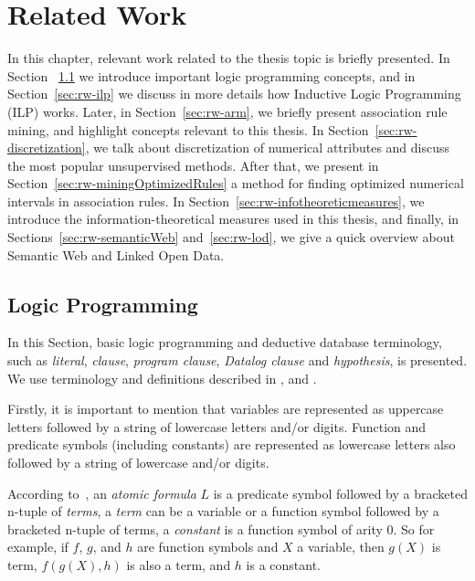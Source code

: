 \chapter{Related Work}
\label{sec:rw-intro}

In this chapter, relevant work related to the thesis topic is briefly presented. In Section 
~\ref{sec:rw-lp} we introduce important logic programming concepts, and in Section~\ref{sec:rw-ilp} we discuss in
more details how Inductive Logic Programming (ILP) works. Later, in Section~\ref{sec:rw-arm}, we briefly present
association rule mining, and highlight concepts relevant to this thesis. In Section~\ref{sec:rw-discretization}, we
talk about discretization of numerical attributes and discuss the most popular unsupervised methods. After that, we
present in Section~\ref{sec:rw-miningOptimizedRules} a method for finding optimized numerical intervals in association
rules. In Section~\ref{sec:rw-infotheoreticmeasures}, we introduce the information-theoretical measures used in this
thesis, and finally, in Sections~\ref{sec:rw-semanticWeb} and~\ref{sec:rw-lod}, we give a quick overview about Semantic
Web and Linked Open Data.


\section{Logic Programming}
\label{sec:rw-lp}

In this Section, basic logic programming and deductive database terminology, such as \emph{literal}, \emph{clause},
\emph{program clause}, \emph{Datalog clause} and \emph{hypothesis}, is presented. We use terminology and
definitions described in \citet{DBLP:books/sp/Lloyd87}, and \citet{LavracDz94}.

Firstly, it is important to
mention that variables are represented as uppercase letters followed by a string of lowercase letters and/or digits.
Function and predicate symbols (including constants) are represented as lowercase letters also followed by a string of
lowercase and/or digits.

According to~\citet{DBLP:books/sp/Lloyd87}, an \emph{atomic formula} $L$ is a predicate symbol followed by a bracketed
n-tuple of \emph{terms}, a \emph{term} can be a variable or a function symbol followed by a bracketed n-tuple of terms,
a \emph{constant} is a function symbol of arity 0. So for example, if $f$, $g$, and $h$ are function symbols and $X$ a
variable, then $g(X)$ is term, $f(g(X),h)$
is also a term, and $h$ is a constant.

